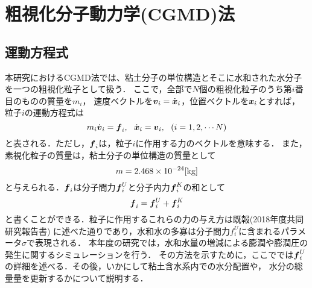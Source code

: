 ﻿%
\section{粗視化分子動力学(CGMD)法}
\subsection{運動方程式}
本研究におけるCGMD法では、粘土分子の単位構造とそこに水和された水分子を一つの粗視化粒子として扱う．
ここで，全部で$N$個の粗視化粒子のうち第$i$番目のものの質量を$m_i$，
速度ベクトルを$\mbox{\boldmath $v$}_i=\dot{\mbox{\boldmath $x$}}_i$，位置ベクトルを$\mbox{\boldmath $x$}_i$とすれば，
粒子$i$の運動方程式は
\begin{equation}
	m_i \dot {\fat{v}}_i =\fat{f}_i ,\ \ 
	\dot{\fat{x}}_i = \fat{v}_i, \ \ ( i =1,2,\cdots N )
	\label{eqn:eq_mot}
\end{equation}
と表される．ただし，$\mbox{\boldmath $f$}_i$は，粒子$i$に作用する力のベクトルを意味する．
また，素視化粒子の質量は，粘土分子の単位構造の質量として
\begin{equation}
	m=2.468\times 10 ^{-24}[{\rm kg}]
	\label{eqn:mass}
\end{equation}
と与えられる．$\mbox{\boldmath $f$}_i$は分子間力$\mbox{\boldmath $f$}_i^{U}$と分子内力$\mbox{\boldmath $f$}_i^{K}$の和として
\begin{equation}
	\mbox{\boldmath $f$}_i=\mbox{\boldmath $f$}_i^U+\mbox{\boldmath $f$}_i^K
	\label{eqn:f_tot}
\end{equation}
と書くことができる．粒子に作用するこれらの力の与え方は既報(2018年度共同研究報告書)
に述べた通りであり，水和水の多寡は分子間力$f_i^U$に含まれるパラメータ$\sigma$で表現される．
本年度の研究では，水和水量の増減による膨潤や膨潤圧の発生に関するシミュレーションを行う．
その方法を示すために，ここででは$\mbox{\boldmath $f$}_i^U$の詳細を述べる．その後，いかにして粘土含水系内での水分配置や，
水分の総量量を更新するかについて説明する．\\

